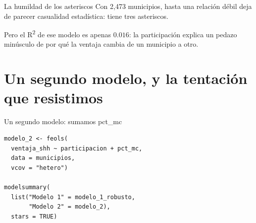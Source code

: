 \begin{frame}{La humildad de los asteriscos}
  \vspace{0.3em}
  Con 2{,}473 municipios, hasta una relación débil deja de parecer
  casualidad estadística:  tiene tres asteriscos.

  \vspace{0.6em}
  Pero el R\textsuperscript{2} de ese modelo es apenas $0.016$: la
  participación explica un pedazo minúsculo de por qué la ventaja cambia de
  un municipio a otro.

  \vspace{1.0em}
\end{frame}

\section{Un segundo modelo, y la tentación que resistimos}

\begin{frame}[fragile]{Un segundo modelo: sumamos pct\_mc}
\begin{lstlisting}
modelo_2 <- feols(
  ventaja_shh ~ participacion + pct_mc,
  data = municipios,
  vcov = "hetero")

modelsummary(
  list("Modelo 1" = modelo_1_robusto,
       "Modelo 2" = modelo_2),
  stars = TRUE)
\end{lstlisting}
\end{frame}

